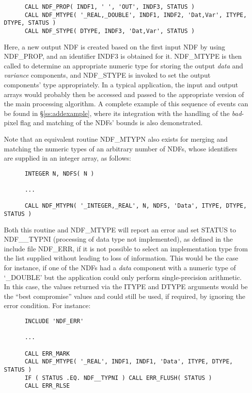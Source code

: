 \documentclass[twoside,11pt]{article}
\newcommand{\htmlref}[2]{#1}
\newcommand{\st}[1]{{\em{#1}}}
\begin{document}
\small
\begin{verbatim}
      CALL NDF_PROP( INDF1, ' ', 'OUT', INDF3, STATUS )
      CALL NDF_MTYPE( '_REAL,_DOUBLE', INDF1, INDF2, 'Dat,Var', ITYPE, DTYPE, STATUS )
      CALL NDF_STYPE( DTYPE, INDF3, 'Dat,Var', STATUS )
\end{verbatim}
\normalsize

Here, a new output NDF is created based on the first input NDF by using
NDF\_PROP, and an identifier INDF3 is obtained for it.
NDF\_MTYPE is then called to determine an appropriate numeric type for
storing the output \st{data\/} and \st{variance\/} components, and \htmlref{NDF\_STYPE}{NDF_STYPE}
is invoked to set the output components' type appropriately. 
In a typical application, the input and output arrays would probably then be
accessed and passed to the appropriate version of the main processing
algorithm.
A complete example of this sequence of events can be found in 
\S\ref{ss:addexample}, where its integration with the handling of the
\st{bad\/}-pixel flag and matching of the NDFs' bounds is also
demonstrated.  

Note that an equivalent routine \htmlref{NDF\_MTYPN}{NDF_MTYPN} also exists for merging and
matching the numeric types of an arbitrary number of NDFs, whose identifiers
are supplied in an integer array, as follows: 

\small
\begin{verbatim}
      INTEGER N, NDFS( N )

      ...

      CALL NDF_MTYPN( '_INTEGER,_REAL', N, NDFS, 'Data', ITYPE, DTYPE, STATUS )
\end{verbatim}
\normalsize

Both this routine and NDF\_MTYPE will report an error and set STATUS to
NDF\_\_TYPNI (processing of data type not implemented), as defined in the
include file NDF\_ERR, if it is not possible to select an implementation
type from the list supplied without leading to loss of information. 
This would be the case for instance, if one of the NDFs had a \st{data\/}
component with a numeric type of `\_DOUBLE' but the application could only
perform single-precision arithmetic. 
In this case, the values returned via the ITYPE and DTYPE arguments would be
the ``best compromise'' values and could still be used, if required, by
ignoring the error condition. 
For instance:

\small
\begin{verbatim}
      INCLUDE 'NDF_ERR'

      ...

      CALL ERR_MARK
      CALL NDF_MTYPE( '_REAL', INDF1, INDF1, 'Data', ITYPE, DTYPE, STATUS )
      IF ( STATUS .EQ. NDF__TYPNI ) CALL ERR_FLUSH( STATUS )
      CALL ERR_RLSE
\end{verbatim}      
\normalsize
\end{document}
